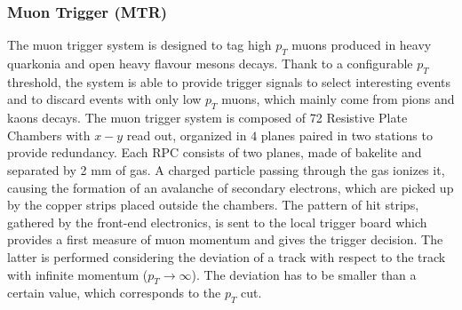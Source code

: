 \subsubsection{Muon Trigger (MTR)}
The muon trigger system is designed to tag high $p_T$ muons produced in heavy quarkonia and open heavy flavour mesons decays.
Thank to a configurable $p_T$ threshold, the system is able to provide trigger signals to select interesting events and to discard events with only low $p_T$ muons, which mainly come from pions and kaons decays.
The muon trigger system is composed of 72 Resistive Plate Chambers with $x-y$ read out, organized in $4$ planes paired in two stations to provide redundancy.
Each RPC consists of two planes, made of bakelite and separated by 2 mm of gas.
A charged particle passing through the gas ionizes it, causing the formation of an avalanche of secondary electrons, which are picked up by the copper strips placed outside the chambers.
The pattern of hit strips, gathered by the front-end electronics, is sent to the local trigger board which provides a first measure of muon momentum and gives the trigger decision.
The latter is performed considering the deviation of a track with respect to the track with infinite momentum ($p_T \rightarrow \infty$). The deviation has to be smaller than a certain value, which corresponds to the $p_T$ cut.